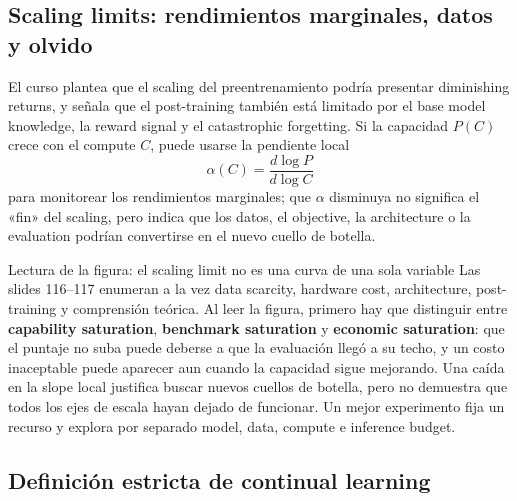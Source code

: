 \subsection{Scaling limits: rendimientos marginales, datos y olvido}

El curso plantea que el scaling del preentrenamiento podría presentar diminishing returns, y señala que el post-training también está limitado por el base model knowledge, la reward signal y el catastrophic forgetting. Si la capacidad $P(C)$ crece con el compute $C$, puede usarse la pendiente local
\[
\alpha(C)=\frac{d\log P}{d\log C}
\]
para monitorear los rendimientos marginales; que $\alpha$ disminuya no significa el «fin» del scaling, pero indica que los datos, el objective, la architecture o la evaluation podrían convertirse en el nuevo cuello de botella.





\begin{knowledgebox}{Lectura de la figura: el scaling limit no es una curva de una sola variable}
Las slides 116--117 enumeran a la vez data scarcity, hardware cost, architecture, post-training y comprensión teórica. Al leer la figura, primero hay que distinguir entre \textbf{capability saturation}, \textbf{benchmark saturation} y \textbf{economic saturation}: que el puntaje no suba puede deberse a que la evaluación llegó a su techo, y un costo inaceptable puede aparecer aun cuando la capacidad sigue mejorando. Una caída en la slope local justifica buscar nuevos cuellos de botella, pero no demuestra que todos los ejes de escala hayan dejado de funcionar. Un mejor experimento fija un recurso y explora por separado model, data, compute e inference budget.
\end{knowledgebox}


\subsection{Definición estricta de continual learning}

